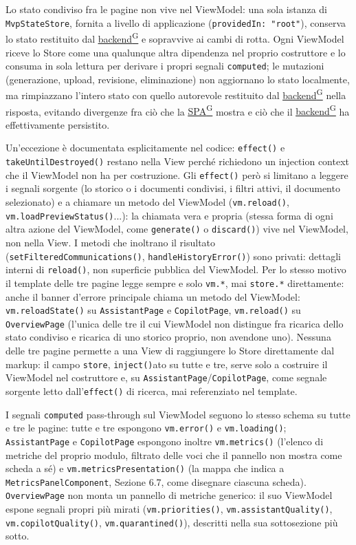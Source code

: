 \documentclass[a4paper,12pt]{article}
\providecommand{\glslink}[2]{\href{https://alittlebyte-19.github.io/Documentazione/glossario.html\#gls-#1}{\underline{#2}\textsuperscript{\scriptsize G}}}
\begin{document}
\begin{sloppypar}
Lo stato condiviso fra le pagine non vive nel ViewModel: una sola istanza di \texttt{MvpStateStore}, fornita a livello di applicazione (\texttt{providedIn: "root"}), conserva lo stato restituito dal \glslink{backend}{backend} e sopravvive ai cambi di rotta. Ogni ViewModel riceve lo Store come una qualunque altra dipendenza nel proprio costruttore e lo consuma in sola lettura per derivare i propri segnali \texttt{computed}; le mutazioni (generazione, upload, revisione, eliminazione) non aggiornano lo stato localmente, ma rimpiazzano l'intero stato con quello autorevole restituito dal \glslink{backend}{backend} nella risposta, evitando divergenze fra ciò che la \glslink{spa-single-page-application}{SPA} mostra e ciò che il \glslink{backend}{backend} ha effettivamente persistito.

Un'eccezione è documentata esplicitamente nel codice: \texttt{effect()} e \texttt{takeUntilDestroyed()} restano nella View perché richiedono un injection context che il ViewModel non ha per costruzione. Gli \texttt{effect()} però si limitano a leggere i segnali sorgente (lo storico o i documenti condivisi, i filtri attivi, il documento selezionato) e a chiamare un metodo del ViewModel (\texttt{vm.reload()}, \texttt{vm.loadPreviewStatus()}...): la chiamata vera e propria (stessa forma di ogni altra azione del ViewModel, come \texttt{generate()} o \texttt{discard()}) vive nel ViewModel, non nella View. I metodi che inoltrano il risultato (\texttt{setFilteredCommunications()}, \texttt{handleHistoryError()}) sono privati: dettagli interni di \texttt{reload()}, non superficie pubblica del ViewModel. Per lo stesso motivo il template delle tre pagine legge sempre e solo \texttt{vm.*}, mai \texttt{store.*} direttamente: anche il banner d'errore principale chiama un metodo del ViewModel: \texttt{vm.reloadState()} su \texttt{AssistantPage} e \texttt{CopilotPage}, \texttt{vm.reload()} su \texttt{OverviewPage} (l'unica delle tre il cui ViewModel non distingue fra ricarica dello stato condiviso e ricarica di uno storico proprio, non avendone uno). Nessuna delle tre pagine permette a una View di raggiungere lo Store direttamente dal markup: il campo \texttt{store}, \texttt{inject()}ato su tutte e tre, serve solo a costruire il ViewModel nel costruttore e, su \texttt{AssistantPage}/\texttt{CopilotPage}, come segnale sorgente letto dall'\texttt{effect()} di ricerca, mai referenziato nel template.

I segnali \texttt{computed} pass-through sul ViewModel seguono lo stesso schema su tutte e tre le pagine: tutte e tre espongono \texttt{vm.error()} e \texttt{vm.loading()}; \texttt{AssistantPage} e \texttt{CopilotPage} espongono inoltre \texttt{vm.metrics()} (l'elenco di metriche del proprio modulo, filtrato delle voci che il pannello non mostra come scheda a sé) e \texttt{vm.metricsPresentation()} (la mappa che indica a \texttt{MetricsPanelComponent}, Sezione 6.7, come disegnare ciascuna scheda). \texttt{OverviewPage} non monta un pannello di metriche generico: il suo ViewModel espone segnali propri più mirati (\texttt{vm.priorities()}, \texttt{vm.assistantQuality()}, \texttt{vm.copilotQuality()}, \texttt{vm.quarantined()}), descritti nella sua sottosezione più sotto.


\end{sloppypar}
\end{document}
